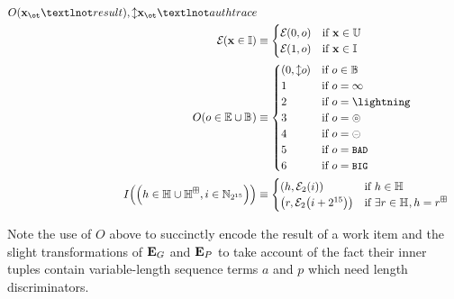 \begin{align}
{    \encoderesult{\otX_\ot¬result},
    \var{\otX_\ot¬authtrace}
  }
  \\
  \encode{\aiX \in \accinput} &\equiv \begin{cases}
      \encode{0, o} &\when \aiX \in \operandtuple \\
      \encode{1, o} &\when \aiX \in \accinput \\
  \end{cases}
  \\
  \encoderesult{o \in \workerror \cup \blob} &\equiv \begin{cases}
    \tup{0, \var{o}} &\when o \in \blob \\
    1 &\when o = \infty \\
    2 &\when o = \panic \\
    3 &\when o = \badexports \\
    4 &\when o = \oversize \\
    5 &\when o = \token{BAD} \\
    6 &\when o = \token{BIG}
    \\
  \end{cases}
  \\
  \encodeimportref{\tup{
    h \in \hash \cup \hash^\boxplus,
    i \in \Nbits{15}
  }} &\equiv \begin{cases}
    \tup{h, \encode[2]{i}} &\when h \in \hash\\
    \tup{r, \encode[2]{i + 2^{15}}} &\when \exists r \in \hash, h = r^\boxplus\\
  \end{cases}
\end{align}

Note the use of $O$ above to succinctly encode the result of a work item and the slight transformations of $\mathbf{E}_G$ and $\mathbf{E}_P$ to take account of the fact their inner tuples contain variable-length sequence terms $a$ and $p$ which need length discriminators.

